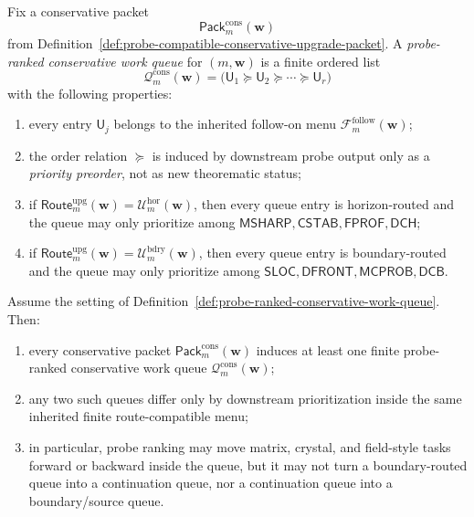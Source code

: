 \begin{definition}
\label{def:probe-ranked-conservative-work-queue}
Fix a conservative packet
\[
  \mathsf{Pack}^{\mathrm{cons}}_{m}(\mathbf w)
\]
from Definition~\ref{def:probe-compatible-conservative-upgrade-packet}. A \emph{probe-ranked conservative work queue} for \((m,\mathbf w)\) is a finite ordered list
\[
  \mathcal Q^{\mathrm{cons}}_{m}(\mathbf w)
  =
  \bigl(\mathsf U_1\succcurlyeq \mathsf U_2\succcurlyeq \cdots \succcurlyeq \mathsf U_r\bigr)
\]
with the following properties:
\begin{enumerate}[label=(\roman*)]
  \item every entry \(\mathsf U_j\) belongs to the inherited follow-on menu \(\mathcal F^{\mathrm{follow}}_{m}(\mathbf w)\);
  \item the order relation \(\succcurlyeq\) is induced by downstream probe output only as a \emph{priority preorder}, not as new theorematic status;
  \item if \(\mathsf{Route}^{\mathrm{upg}}_{m}(\mathbf w)=\mathcal U^{\mathrm{hor}}_{m}(\mathbf w)\), then every queue entry is horizon-routed and the queue may only prioritize among \(\mathsf{MSHARP},\mathsf{CSTAB},\mathsf{FPROF},\mathsf{DCH}\);
  \item if \(\mathsf{Route}^{\mathrm{upg}}_{m}(\mathbf w)=\mathcal U^{\mathrm{bdry}}_{m}(\mathbf w)\), then every queue entry is boundary-routed and the queue may only prioritize among \(\mathsf{SLOC},\mathsf{DFRONT},\mathsf{MCPROB},\mathsf{DCB}\).
\end{enumerate}
\end{definition}

\begin{proposition}
\label{prop:every-conservative-packet-induces-a-finite-route-compatible-work-queue}
Assume the setting of Definition~\ref{def:probe-ranked-conservative-work-queue}. Then:
\begin{enumerate}[label=(\roman*)]
  \item every conservative packet \(\mathsf{Pack}^{\mathrm{cons}}_{m}(\mathbf w)\) induces at least one finite probe-ranked conservative work queue \(\mathcal Q^{\mathrm{cons}}_{m}(\mathbf w)\);
  \item any two such queues differ only by downstream prioritization inside the same inherited finite route-compatible menu;
  \item in particular, probe ranking may move matrix, crystal, and field-style tasks forward or backward inside the queue, but it may not turn a boundary-routed queue into a continuation queue, nor a continuation queue into a boundary/source queue.
\end{enumerate}
\end{proposition}

